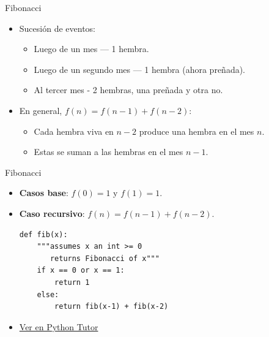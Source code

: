 \documentclass[mathserif]{beamer}
\begin{document}

\begin{frame}[fragile]{Fibonacci}
    \begin{itemize}
        \item Sucesión de eventos:
        \begin{itemize}
            \item Luego de un mes --- 1 hembra.
            \item Luego de un segundo mes --- 1 hembra (ahora preñada).
            \item Al tercer mes - 2 hembras, una preñada y otra no.
        \end{itemize}
        
        \item En general, $f(n) = f(n-1) + f(n-2)$: \begin{itemize}
            \item Cada hembra viva en $n-2$ produce una hembra en el mes $n$.
            \item Estas se suman a las hembras en el mes $n-1$.
        \end{itemize}
    \end{itemize}
\end{frame}

\begin{frame}[fragile]{Fibonacci}
    \begin{itemize}
        \item {\blue\bfseries Casos base}: $f(0)=1$ y $f(1)=1$.
        \item {\blue\bfseries Caso recursivo}: $f(n) = f(n-1) + f(n-2)$.
    
\begin{lstlisting}
def fib(x):
    """assumes x an int >= 0
       returns Fibonacci of x"""
    if x == 0 or x == 1:
        return 1
    else:
        return fib(x-1) + fib(x-2)
\end{lstlisting}

        \item \href{http://pythontutor.com/visualize.html#code=def%20fib%28x%29%3A%0A%20%20%20%20%22%22%22assumes%20x%20an%20int%20%3E%3D%200%0A%20%20%20%20%20%20%20returns%20Fibonacci%20of%20x%22%22%22%0A%20%20%20%20if%20x%20%3D%3D%200%20or%20x%20%3D%3D%201%3A%0A%20%20%20%20%20%20%20%20return%201%0A%20%20%20%20else%3A%0A%20%20%20%20%20%20%20%20return%20fib%28x-1%29%20%2B%20fib%28x-2%29%0A%20%20%20%20%20%20%20%20%0Aprint%28fib%284%29%29&cumulative=false&curInstr=38&heapPrimitives=nevernest&mode=display&origin=opt-frontend.js&py=3&rawInputLstJSON=%5B%5D&textReferences=false}{Ver en Python Tutor}
    \end{itemize}
\end{frame}
\end{document}
